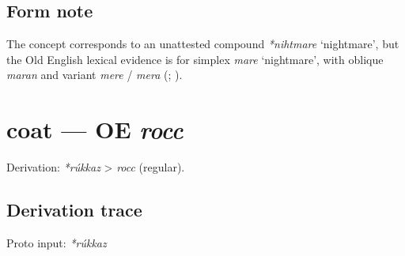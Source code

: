 \documentclass[
  british,
  a4paper,
  openany]{book}
\providecommand{\Recon}[1]{\emph{*#1}}
{\catcode`→=\active \global\def→{\ensuremath{\rightarrow}}}
\providecommand{\texorpdfstring}[2]{#1}
\providecommand{\Recon}[1]{\emph{*#1}}
{\catcode`→=\active \global\def→{\ensuremath{\rightarrow}}}
\begin{document}
\subsection{Form note}\label{form-note-14}

The concept corresponds to an unattested compound \Recon{nihtmare}
`nightmare', but the Old English lexical evidence is for simplex
\emph{mare} `nightmare', with oblique \emph{maran} and variant
\emph{mere} / \emph{mera} (; ).

\section{\texorpdfstring{coat --- OE
\emph{rocc}}{coat --- OE rocc}}\label{coat-oe-rocc}


Derivation: \emph{*rúkkaz} \textgreater{} \emph{rocc} (regular).

\subsection{Derivation trace}\label{derivation-trace-42}

Proto input: \emph{*rúkkaz}

\begingroup
\setlength{\fboxsep}{6pt}
\end{document}
